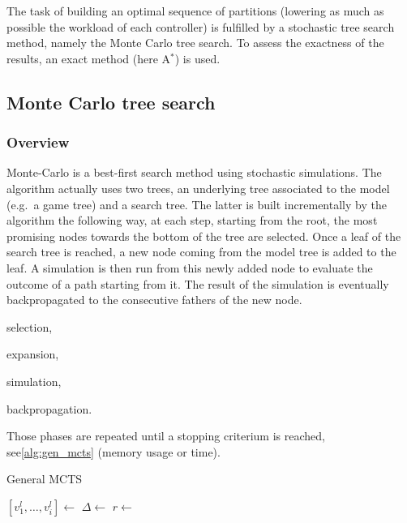 \documentclass[twoside,twocolumn]{article}
\begin{document}
The task of building an optimal sequence of partitions (lowering
as much as possible the workload of each controller) is fulfilled by a
stochastic tree search method, namely the Monte Carlo tree search. To assess the
exactness of the results, an exact method (here A\(^*\)) is used.

\subsection{Monte Carlo tree search}
\subsubsection{Overview}
Monte-Carlo is a best-first search method using stochastic simulations. The
algorithm actually uses two trees, an underlying tree associated to the model
(e.g.\ a game tree) and a search tree. The latter is built incrementally by the
algorithm the following way, at each step, starting from the root, the most
promising nodes towards the bottom of the tree are selected. Once a leaf of the
search tree is reached, a new node coming from the model tree is added to the
leaf. A simulation is then run from this newly added node to evaluate the
outcome of a path starting from it. The result of the simulation is eventually
backpropagated to the consecutive fathers of the new node.
\begin{compactenum}
	\item selection,
	\item expansion,
	\item simulation,
	\item backpropagation.
\end{compactenum}
Those phases are repeated until a stopping criterium is reached,
see\ref{alg:gen_mcts} (memory usage or time).
\begin{algorithm}
	\caption{General MCTS~\cite{browne2012survey}}\label{alg:gen_mcts}
	\begin{algorithmic}
		\State{} \([v^l_1, \dots, v^l_i] \gets\) 
		\State{} \(\Delta \gets\) 
		\State{} \(r \gets\) 
		\State{} 
		\EndWhile{}
		\EndProcedure{}
	\end{algorithmic}
\end{algorithm}
\end{document}
